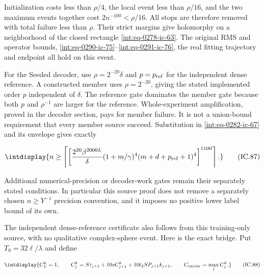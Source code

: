 Initialization costs less than \(\rho/4\), the local event less than \(\rho/16\), and the two maximum events together cost \(2n^{-100}<\rho/16\). All stops are therefore removed with total failure less than \(\rho\). Their strict margins give holomorphy on a neighborhood of the closed rectangle \eqref{int:eq-0278-ic-63}. The original RMS and operator bounds, \eqref{int:eq-0290-ic-75}--\allowbreak \eqref{int:eq-0291-ic-76}, the real fitting trajectory and endpoint all hold on this event.



For the Seeded decoder, use \(\rho=2^{-20}\delta\) and \(p=p_{\rm ref}\) for the independent dense reference. A constructed member uses \(\rho=2^{-20}\), giving the stated implemented order \(p\) independent of \(\delta\). The reference gate dominates the member gate because both \(p\) and \(\rho^{-1}\) are larger for the reference. Whole-experiment amplification, proved in the decoder section, pays for member failure. It is not a union-bound requirement that every member source succeed. Substitution in \eqref{int:eq-0282-ic-67} and its envelope gives exactly


\begingroup\renewcommand{\theHequation}{intdisplay.685}
\begin{equation}
\intdisplay{
n\ge\left\lceil\left[
 \frac{2^{20}\beta^{2000L}}{\delta}
 (1+m/\gamma)^4(m+d+p_{\rm ref}+1)^4
 \right]^{1100}\right\rceil.
}
\tag{IC.87}
\label{int:eq-0302-ic-87}
\end{equation}
\endgroup


Additional numerical-precision or decoder-work gates remain their separately stated conditions. In particular this source proof does not remove a separately chosen \(n\ge Y^{-1}\) precision convention, and it imposes no positive lower label bound of its own.



The independent dense-reference certificate also follows from this training-only source, with no qualitative complex-sphere event. Here is the exact bridge. Put \(T_0=32\ell/\lambda\) and define


\begingroup\renewcommand{\theHequation}{intdisplay.686}
\begin{equation}
\intdisplay{
C_L^k=1,\qquad
 C_j^k=S\tau_{j+1}+10sC_{j+1}^k
                +10t_2SP_{j+1}k_{j+1},\qquad
 C_{\rm carrier}=\max_j C_j^k.
}
\tag{IC.88}
\label{int:eq-0303-ic-88}
\end{equation}
\endgroup

